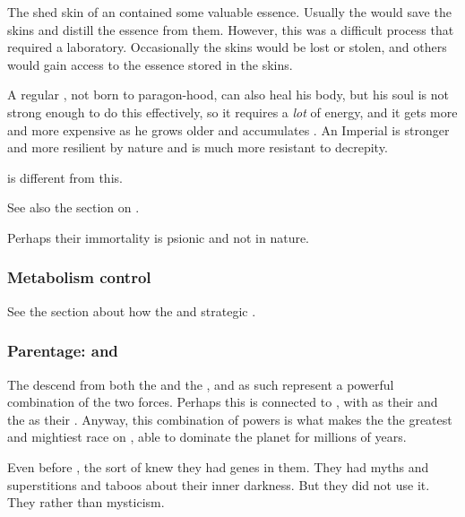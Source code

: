 The shed skin of an \ophidian{} contained some valuable essence. 
Usually the \ophidians would save the skins and distill the essence from them. 
However, this was a difficult process that required a laboratory. 
Occasionally the skins would be lost or stolen, and others would gain access to the essence stored in the skins. 

A regular \ophidian, not born to paragon-hood, can also heal his body, but his soul is not strong enough to do this effectively, so it requires a \emph{lot} of energy, and it gets more and more expensive as he grows older and accumulates . 
An Imperial is stronger and more resilient by nature and is much more resistant to decrepity. 

 is different from this. 

See also the section on . 

Perhaps their immortality is psionic and not  in nature. 





\subsubsection{Metabolism control}
See the section about how the \ophidians {} and strategic . 





\subsubsection{Parentage: \Voyagers and \xss}
The \ophidians{} descend from both the \voyagers{} and the \xss, and as such represent a powerful combination of the two forces. 
Perhaps this is connected to , with \xsic{} \Chaos{} as their  and the \voyagers{} as their . 
Anyway, this combination of powers is what makes the \ophidians{} the greatest and mightiest race on \Miith{}, able to dominate the planet for millions of years. 

Even before \Sethicus, the \ophidians sort of knew they had \xs genes in them. 
They had myths and superstitions and taboos about their inner darkness. 
But they did not use it.
They  rather than mysticism. 

